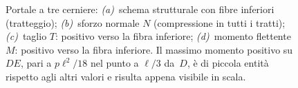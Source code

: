 \begin{figure}[htbp]
{%
}%
\caption{Portale a tre cerniere:
	\emph{(a)}~schema strutturale con fibre inferiori (tratteggio);
	\emph{(b)}~sforzo normale $N$ (compressione in tutti i tratti);
	\emph{(c)}~taglio $T$: positivo verso la fibra inferiore;
	\emph{(d)}~momento flettente $M$: positivo verso la fibra inferiore.
	Il massimo momento positivo su~$DE$, pari a $p\ell^2/18$
	nel punto a $\ell/3$ da~$D$, è di piccola entità rispetto
	agli altri valori e risulta appena visibile in scala.}
\label{fig:arco3c_NTM}
\end{figure}
